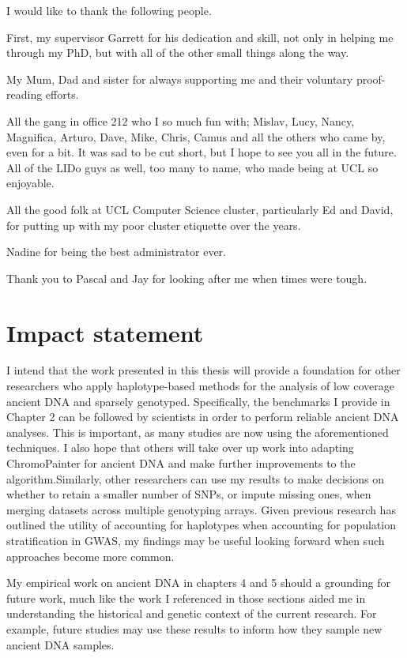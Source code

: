 \begin{acknowledgements}
\noindent
I would like to thank the following people.

\noindent
First, my supervisor Garrett for his dedication and skill, not only in helping me through my PhD, but with all of the other small things along the way. 

\noindent
My Mum, Dad and sister for always supporting me and their voluntary proof-reading efforts.

\noindent
All the gang in office 212 who I so much fun with; Mislav, Lucy, Nancy, Magnifica, Arturo, Dave, Mike, Chris, Camus and all the others who came by, even for a bit. It was sad to be cut short, but I hope to see you all in the future. All of the LIDo guys as well, too many to name, who made being at UCL so enjoyable. 


\noindent
All the good folk at UCL Computer Science cluster, particularly Ed and David, for putting up with my poor cluster etiquette over the years. 

\noindent
Nadine for being the best administrator ever.

\noindent
Thank you to Pascal and Jay for looking after me when times were tough. 
\end{acknowledgements}


\section{Impact statement}

I intend that the work presented in this thesis will provide a foundation for other researchers who apply haplotype-based methods for the analysis of low coverage ancient DNA and sparsely genotyped. Specifically, the benchmarks I provide in Chapter 2 can be followed by scientists in order to perform reliable ancient DNA analyses. This is important, as many studies are now using the aforementioned techniques. I also hope that others will take over up work into adapting ChromoPainter for ancient DNA and make further improvements to the algorithm.Similarly, other researchers can use my results to make decisions on whether to retain a smaller number of SNPs, or impute missing ones, when merging datasets across multiple genotyping arrays. Given previous research has outlined the utility of accounting for haplotypes when accounting for population stratification in GWAS, my findings may be useful looking forward when such approaches become more common. 

My empirical work on ancient DNA in chapters 4 and 5 should a grounding for future work, much like the work I referenced in those sections aided me in understanding the historical and genetic context of the current research. For example, future studies may use these results to inform how they sample new ancient DNA samples. 

